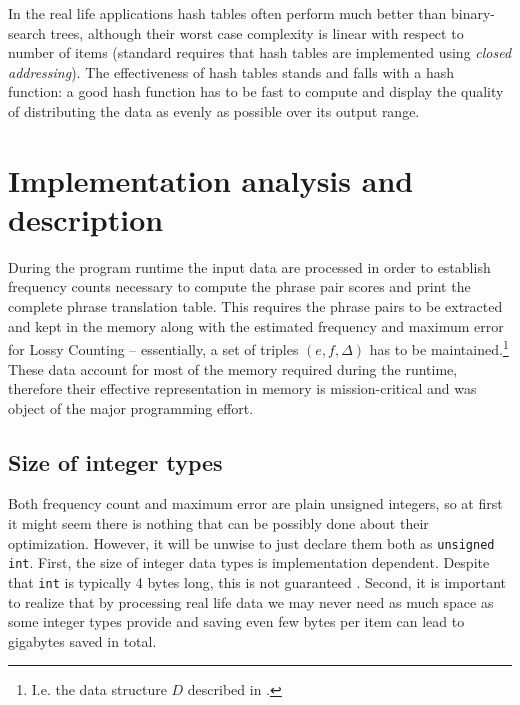 In the real life applications hash tables often perform much better than binary-search
trees, although their worst case complexity is linear with respect to number of items
(standard requires that hash tables are implemented using
\emph{closed addressing}).
The effectiveness of hash tables stands and falls with a hash function:
a good hash function has to be fast to compute and display the quality of distributing
the data as evenly as possible over its output range.

\section{Implementation analysis and description}

During the program runtime the input data are processed in order to establish frequency counts
necessary to compute the phrase pair scores and print the complete phrase translation table.
This requires the phrase pairs to be extracted and kept in the memory along with the estimated
frequency and maximum error for Lossy Counting -- essentially, a set of triples $(e, f, \Delta)$
has to be maintained.\footnote{I.e. the data structure $D$ described in .}
These data account for most of the memory required during the runtime, therefore their effective
representation in memory is mission-critical and was object of the major programming effort.

\subsection{Size of integer types}

Both frequency count and maximum error are plain unsigned integers, so at first it might seem
there is nothing that can be possibly done about their optimization.
However, it will be unwise to just declare them both as \verb|unsigned int|.
First, the size of integer data types is implementation dependent.
Despite that \verb|int| is typically 4 bytes long, this is not guaranteed \citep[Chapter 4.6]{stroustrup:cplusplus}.
Second, it is important to realize that by processing real life data we may never need as much
space as some integer types provide and saving even few bytes per item can lead to gigabytes
saved in total.

